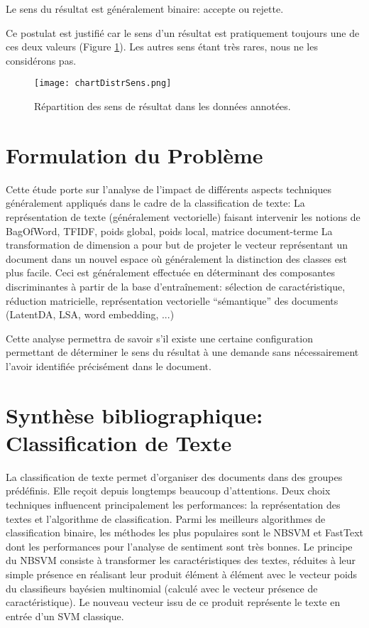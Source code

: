 \begin{postulat}\label{postulat:sens:sensbinaire}
Le sens du résultat est généralement binaire: accepte ou rejette.
\end{postulat} 
Ce postulat est justifié car le sens d'un résultat est pratiquement toujours une de ces deux valeurs (Figure \ref{stat-sensrst}). Les autres sens étant très rares, nous ne les considérons pas.

\begin{figure}
\texttt{[image: chartDistrSens.png]}
\caption{Répartition des sens de résultat dans les données annotées.}\label{stat-sensrst}
\end{figure}
\section{Formulation du Problème}
\label{sec:sensresultat:probleme}

Cette étude porte sur l'analyse de l'impact de différents aspects techniques généralement appliqués dans le cadre de la classification de texte:
La représentation de texte (généralement vectorielle) faisant intervenir les notions de BagOfWord, TFIDF, poids global, poids local, matrice document-terme
La transformation de dimension a pour but de projeter le vecteur représentant un document dans un nouvel espace où généralement la distinction des classes est plus facile. Ceci est généralement effectuée en déterminant des composantes discriminantes à partir de la base d'entraînement: sélection de caractéristique, réduction matricielle, représentation vectorielle “sémantique” des documents (LatentDA, LSA, word embedding, ...)

 Cette analyse permettra de savoir s'il existe une certaine configuration permettant de déterminer le sens du résultat à une demande sans nécessairement l'avoir identifiée précisément dans le document. 


\section{Synthèse bibliographique: Classification de Texte}
\label{sec:sensresultat:biblio_classif}

La classification de texte permet d'organiser des documents dans des groupes prédéfinis. Elle reçoit depuis longtemps beaucoup d'attentions. Deux choix techniques influencent principalement les performances: la représentation des textes et l'algorithme de classification. Parmi les meilleurs algorithmes de classification binaire, les méthodes les plus populaires sont le NBSVM et FastText dont les performances pour l'analyse de sentiment sont très bonnes. Le principe du NBSVM \citep{wang2012nbsvm} consiste à transformer les caractéristiques des textes, réduites à leur simple présence en réalisant leur produit élément à élément avec le vecteur poids du classifieurs bayésien multinomial (calculé avec le vecteur présence de caractéristique). Le nouveau vecteur issu de ce produit représente le texte en entrée d'un SVM classique.
  
